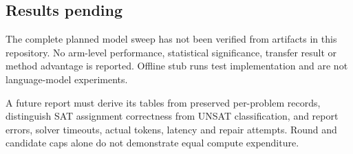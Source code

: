 \subsection*{Results pending}
The complete planned model sweep has not been verified from artifacts in this
repository. No arm-level performance, statistical significance, transfer result
or method advantage is reported. Offline stub runs test implementation and are
not language-model experiments.

A future report must derive its tables from preserved per-problem records,
distinguish SAT assignment correctness from UNSAT classification, and report
errors, solver timeouts, actual tokens, latency and repair attempts. Round and
candidate caps alone do not demonstrate equal compute expenditure.
